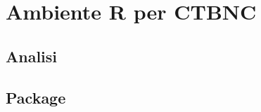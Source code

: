 
\chapter{Ambiente R per CTBNC}
\label{cap:r}

\lipsum[1]

\section{Analisi}
\lipsum[2]

\section{Package}
\lipsum[3]

